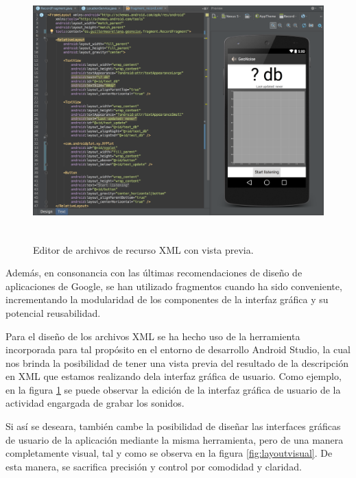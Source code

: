 \begin{figure}[h] \centering
    \includegraphics[height=10cm]{graphs/layoutedit.png} \caption{Editor de archivos de recurso XML con vista previa.}\label{fig:layoutedit}
\end{figure}

Además, en consonancia con las últimas recomendaciones de diseño de aplicaciones de Google, se han utilizado fragmentos cuando ha sido conveniente, incrementando la modularidad de los componentes de la interfaz gráfica y su potencial reusabilidad.

Para el diseño de los archivos XML se ha hecho uso de la herramienta incorporada para tal propósito en el entorno de desarrollo Android Studio, la cual nos brinda la posibilidad de tener una vista previa del resultado de la descripción en XML que estamos realizando dela interfaz gráfica de usuario. Como ejemplo, en la figura \ref{fig:layoutedit} se puede observar la edición de la interfaz gráfica de usuario de la actividad engargada de grabar los sonidos.

Si así se deseara, también cambe la posibilidad de diseñar las interfaces gráficas de usuario de la aplicación mediante la misma herramienta, pero de una manera completamente visual, tal y como se observa en la figura \ref{fig:layoutvisual}. De esta manera, se sacrifica precisión y control por comodidad y claridad.

